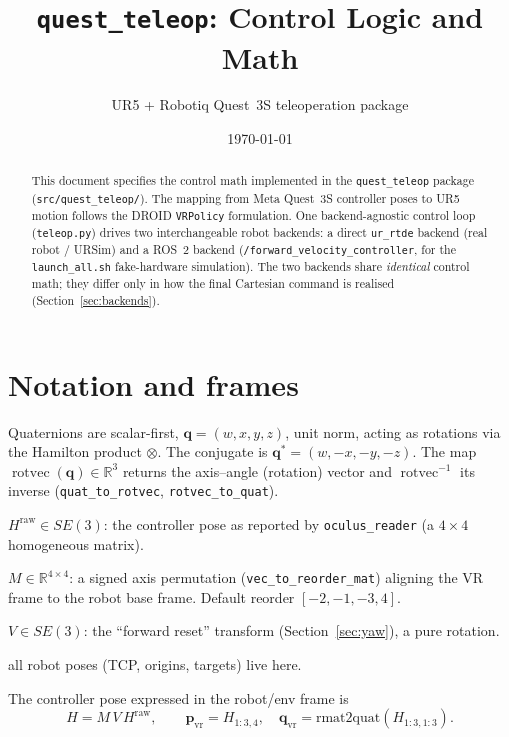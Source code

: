 \documentclass[11pt]{article}
\title{\texttt{quest\_teleop}: Control Logic and Math}
\author{UR5 + Robotiq Quest~3S teleoperation package}
\date{\today}
\newcommand{\R}{\mathbb{R}}
\newcommand{\quat}[1]{\bm{#1}}
\newcommand{\vp}{\bm{p}}
\DeclareMathOperator{\rotvec}{rotvec}
\begin{document}
\maketitle

\begin{abstract}
This document specifies the control math implemented in the
\texttt{quest\_teleop} package (\texttt{src/quest\_teleop/}). The mapping from
Meta Quest~3S controller poses to UR5 motion follows the DROID
\texttt{VRPolicy} formulation. One backend-agnostic control loop
(\texttt{teleop.py}) drives two interchangeable robot backends: a direct
\texttt{ur\_rtde} backend (real robot / URSim) and a ROS~2 backend
(\texttt{/forward\_velocity\_controller}, for the \texttt{launch\_all.sh}
fake-hardware simulation). The two backends share \emph{identical} control
math; they differ only in how the final Cartesian command is realised
(Section~\ref{sec:backends}).
\end{abstract}

\tableofcontents

\section{Notation and frames}
Quaternions are scalar-first, $\quat{q}=(w,x,y,z)$, unit norm, acting as
rotations via the Hamilton product $\otimes$. The conjugate is
$\quat{q}^{*}=(w,-x,-y,-z)$. The map $\rotvec(\quat{q})\in\R^3$ returns the
axis--angle (rotation) vector and $\rotvec^{-1}$ its inverse
(\texttt{quat\_to\_rotvec}, \texttt{rotvec\_to\_quat}).

\begin{description}[leftmargin=2.4em,style=nextline]
  \item[VR raw frame] $H^{\text{raw}}\in SE(3)$: the controller pose as
        reported by \texttt{oculus\_reader} (a $4\times4$ homogeneous matrix).
  \item[Global$\to$env remap] $M\in\R^{4\times4}$: a signed axis permutation
        (\texttt{vec\_to\_reorder\_mat}) aligning the VR frame to the robot
        base frame. Default reorder $[-2,-1,-3,4]$.
  \item[Alignment] $V\in SE(3)$: the ``forward reset'' transform
        (Section~\ref{sec:yaw}), a pure rotation.
  \item[Robot base frame] all robot poses (TCP, origins, targets) live here.
\end{description}

The controller pose expressed in the robot/env frame is
\begin{equation}
  H = M \, V \, H^{\text{raw}},\qquad
  \vp_{\text{vr}} = H_{1:3,4},\quad
  \quat{q}_{\text{vr}} = \mathrm{rmat2quat}(H_{1:3,1:3}).
  \label{eq:process}
\end{equation}
\end{document}
